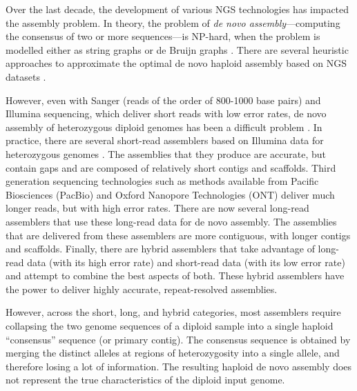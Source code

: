 Over the last decade, the development of various NGS technologies has impacted the assembly problem.
In theory, the problem of \textit{de novo assembly}---computing the consensus of two or more sequences---is NP-hard, when the problem is modelled either as string graphs or de Bruijn graphs \citep{medvedev2007computability}. 
There are several heuristic approaches to approximate the optimal de novo haploid assembly based on NGS datasets \citep{idury1995new, myers1995toward, myers2005fragment, pevzner2001eulerian, nagarajan2009parametric, nagarajan2013sequence, sovic2013approaches}.

However, even with Sanger (reads of the order of 800-1000 base pairs) and Illumina sequencing, which deliver short reads with low error rates, de novo assembly of heterozygous diploid genomes has been a difficult problem \citep{vinson2005assembly, levy2007diploid}.
In practice, there are several short-read assemblers based on Illumina data for heterozygous genomes \citep{kajitani2014efficient, pryszcz2016redundans, simpson2012efficient, bankevich2012spades, li2015fermikit}.
The assemblies that they produce are accurate, but contain gaps and are composed of relatively short contigs and scaffolds. 
Third generation sequencing technologies such as methods available from Pacific Biosciences (PacBio) and Oxford Nanopore Technologies (ONT) deliver much longer reads, but with high error rates.
There are now several long-read assemblers \citep{koren2017canu, vaser2017fast, xiao2016mecat, berlin2015assembling, chin2013nonhybrid, hunt2015circlator, lin2016assembly} that use these long-read data for de novo assembly.
The assemblies that are delivered from these assemblers are more contiguous, with longer contigs and scaffolds.
Finally, there are hybrid assemblers that take advantage of long-read data (with its high error rate) and short-read data (with its low error rate) \citep{bashir2012hybrid, antipov2015hybridspades, zimin2017hybrid} and attempt to combine the best aspects of both.
These hybrid assemblers have the power to deliver highly accurate, repeat-resolved assemblies.

However, across the short, long, and hybrid categories, most assemblers require collapsing the two genome sequences of a diploid sample into a single haploid ``consensus'' sequence (or primary contig). 
The consensus sequence is obtained by merging the distinct alleles at regions of heterozygosity into a single allele, and therefore losing a lot of information.
The resulting haploid de novo assembly does not represent the true characteristics of the diploid input genome. 

